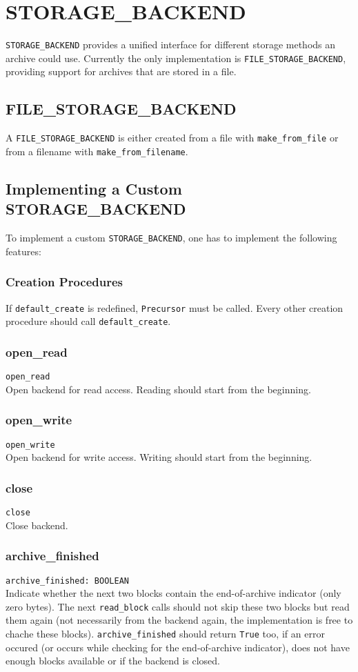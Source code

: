 \chapter{STORAGE\_BACKEND}
\lstinline;STORAGE_BACKEND; provides a unified interface for different storage
methods an archive could use. Currently the only implementation is
\lstinline;FILE_STORAGE_BACKEND;, providing support for archives that are stored
in a file.
\section{FILE\_STORAGE\_BACKEND} A \lstinline;FILE_STORAGE_BACKEND; is either created from a file with
\lstinline;make_from_file; or from a filename with
\lstinline;make_from_filename;.

\section{Implementing a Custom STORAGE\_BACKEND}
To implement a custom \lstinline;STORAGE_BACKEND;, one has to implement the
following features:

\subsection{Creation Procedures}
If \lstinline;default_create; is redefined, \lstinline;Precursor; must be
called. Every other creation procedure should call \lstinline;default_create;.

\subsection{open\_read}
\lstinline;open_read;\\
Open backend for read access. Reading should start from the beginning.

\subsection{open\_write}
\lstinline;open_write;\\
Open backend for write access. Writing should start from the beginning.

\subsection{close}
\lstinline;close;\\
Close backend.

\subsection{archive\_finished}
\lstinline;archive_finished: BOOLEAN;\\
Indicate whether the next two blocks contain the end-of-archive indicator
(only zero bytes). The next \lstinline;read_block; calls should not skip these
two blocks but read them again (not necessarily from the backend again, the
implementation is free to chache these blocks).
\lstinline;archive_finished; should return \lstinline;True; too, if an error
occured (or occurs while checking for the end-of-archive indicator), does not
have enough blocks available or if the backend is closed.


